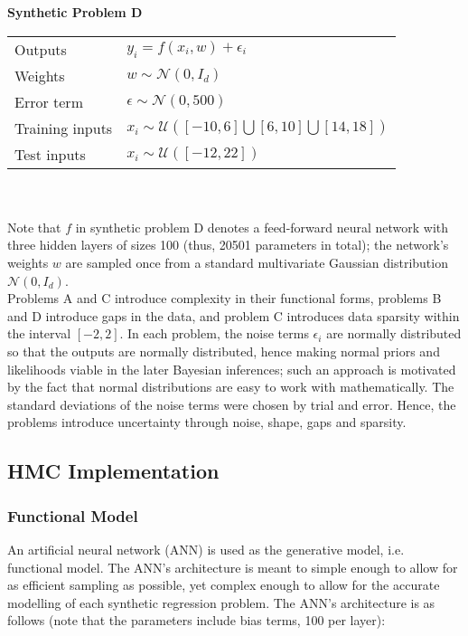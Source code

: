 \documentclass[conference]{IEEEtran}
\begin{document}
\textbf{Synthetic Problem D}

\begin{tabular}{m{2.5cm} | m{6cm}}
    Outputs & $y_i = f(x_i, w) + \epsilon_i$ \\
    Weights & $w \sim \mathcal{N}(0, I_d)$ \\
    Error term & $\epsilon \sim \mathcal{N}(0, 500)$ \\
    Training inputs & $x_i \sim \mathcal{U}([-10, 6] \bigcup [6, 10] \bigcup [14, 18])$ \\
    Test inputs & $x_i \sim \mathcal{U}([-12, 22])$
\end{tabular} \\~\\

Note that $f$ in synthetic problem D denotes a feed-forward neural network with three hidden layers of sizes 100 (thus, 20501 parameters in total); the network's weights $w$ are sampled once from a standard multivariate Gaussian distribution $\mathcal{N}(0, I_d)$.\\

Problems A and C introduce complexity in their functional forms, problems B and D introduce gaps in the data, and problem C introduces data sparsity within the interval $[-2, 2]$. In each problem, the noise terms $\epsilon_i$ are normally distributed so that the outputs are normally distributed, hence making normal priors and likelihoods viable in the later Bayesian inferences; such an approach is motivated by the fact that normal distributions are easy to work with mathematically. The standard deviations of the noise terms were chosen by trial and error. Hence, the problems introduce uncertainty through noise, shape, gaps and sparsity.\\

\subsection{HMC Implementation}
\subsubsection{Functional Model}
An artificial neural network (ANN) is used as the generative model, i.e. functional model. The ANN's architecture is meant to simple enough to allow for as efficient sampling as possible, yet complex enough to allow for the accurate modelling of each synthetic regression problem. The ANN's architecture is as follows (note that the parameters include bias terms, 100 per layer):\\
\end{document}
